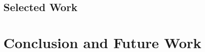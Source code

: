 \documentclass[conference]{IEEEtran}
\begin{document}
\subsection{Selected Work}



\section{Conclusion and Future Work}




\end{document}
